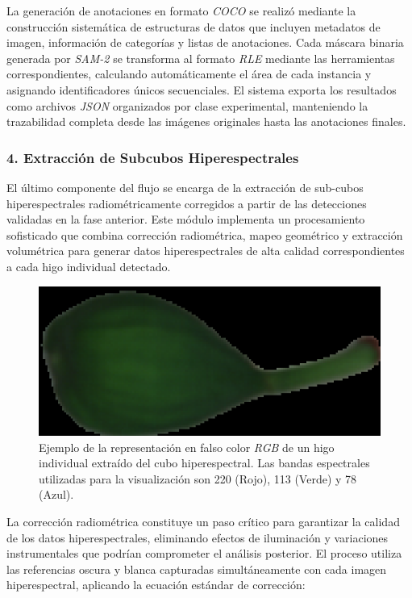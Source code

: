 La generación de anotaciones en formato \emph{COCO} se realizó mediante la construcción sistemática de estructuras de datos que incluyen metadatos de imagen, información de categorías y listas de anotaciones. Cada máscara binaria generada por \emph{SAM-2} se transforma al formato \emph{RLE} mediante las herramientas correspondientes, calculando automáticamente el área de cada instancia y asignando identificadores únicos secuenciales. El sistema exporta los resultados como archivos \emph{JSON} organizados por clase experimental, manteniendo la trazabilidad completa desde las imágenes originales hasta las anotaciones finales.

\subsubsection{4. Extracción de Subcubos Hiperespectrales}

El último componente del flujo se encarga de la extracción de sub-cubos hiperespectrales radiométricamente corregidos a partir de las detecciones validadas en la fase anterior. Este módulo implementa un procesamiento sofisticado que combina corrección radiométrica, mapeo geométrico y extracción volumétrica para generar datos hiperespectrales de alta calidad correspondientes a cada higo individual detectado.

\begin{figure}[ht]
\centering
\includegraphics[width=\textwidth]{images/higo_individual_220_113_78.png}
\caption{Ejemplo de la representación en falso color \emph{RGB} de un higo individual extraído del cubo hiperespectral. Las bandas espectrales utilizadas para la visualización son 220 (Rojo), 113 (Verde) y 78 (Azul).}
\label{fig:higo_individual}
\end{figure}


\vspace{5mm}

La corrección radiométrica constituye un paso crítico para garantizar la calidad de los datos hiperespectrales, eliminando efectos de iluminación y variaciones instrumentales que podrían comprometer el análisis posterior. El proceso utiliza las referencias oscura y blanca capturadas simultáneamente con cada imagen hiperespectral, aplicando la ecuación estándar de corrección:

